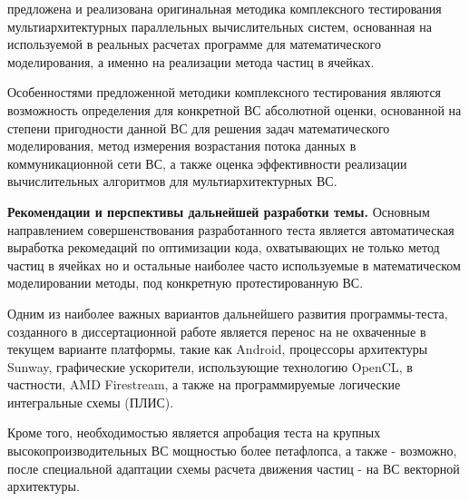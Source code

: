 предложена и реализована оригинальная методика комплексного тестирования мультиархитектурных параллельных вычислительных систем, основанная на используемой в реальных расчетах программе для математического моделирования, а именно на реализации метода частиц в ячейках.

Особенностями предложенной методики комплексного тестирования являются возможность определения для конкретной ВС абсолютной оценки, основанной на степени пригодности данной ВС для решения задач математического моделирования, метод измерения возрастания потока данных в коммуникационной сети ВС, а также оценка эффективности реализации вычислительных алгоритмов для мультиархитектурных ВС.

\textbf{Рекомендации и перспективы дальнейшей разработки темы.}
Основным направлением совершенствования разработанного теста является автоматическая выработка рекомедаций по оптимизации кода, охватывающих не только метод частиц в ячейках но и остальные наиболее часто используемые в математическом моделировании методы,  под конкретную протестированную ВС.

Одним из наиболее важных вариантов дальнейшего развития программы-теста, созданного в диссертационной работе является перенос на не охваченные в текущем варианте платформы, такие как Android, процессоры архитектуры Sunway, графические ускорители, использующие технологию OpenCL, в частности, AMD Firestream, а также на программируемые логические интегральные схемы (ПЛИС).

Кроме того, необходимостью является апробация теста на крупных высокопроизводительных ВС мощностью более петафлопса, а также - возможно, после специальной адаптации схемы расчета движения частиц - на ВС векторной архитектуры.
